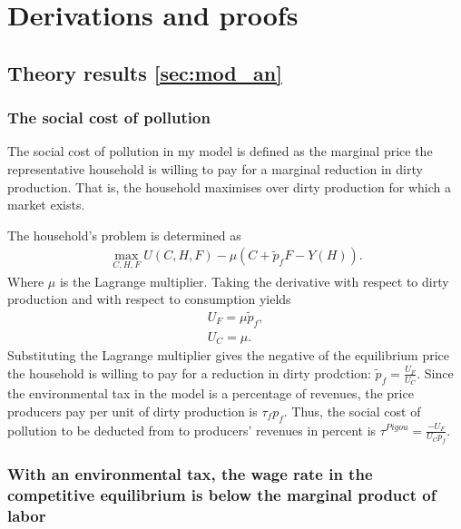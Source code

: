 \section{Derivations and proofs}\label{app:derivations}

\subsection{Theory results \ref{sec:mod_an}}
\subsubsection{The social cost of pollution}

The social cost of pollution in my model is defined as the marginal price the representative household is willing to pay for a marginal reduction in dirty production. That is, the household maximises over dirty production for which a market exists.

The household's problem is determined as
\begin{align}
\underset{C,H,F}{\max} U(C,H,F)-\mu \left(C+\tilde{p}_fF-Y(H)\right).
\end{align}
Where $\mu$ is the Lagrange multiplier. Taking the derivative with respect to dirty production  and with respect to consumption yields
\begin{align}
U_F=\mu \tilde{p}_f,\\
U_C=\mu.
\end{align}
Substituting the Lagrange multiplier gives the negative of the equilibrium price the household is willing to pay for a reduction in dirty prodction: $\tilde{p}_f=\frac{U_F}{U_C}$. Since the environmental tax in the model is a percentage of revenues, the price producers pay per unit of dirty production is $\tau_f p_f$. Thus, the social cost of pollution to be deducted from to producers' revenues in percent is $\tau^{Pigou}=\frac{-U_F}{U_Cp_f}$.
\subsubsection{With an environmental tax, the wage rate in the competitive equilibrium is below the marginal product of labor}\label{app:wageMPL}

